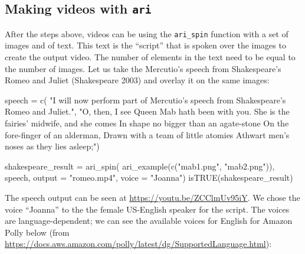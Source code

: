 \hypertarget{making-videos-with-ari-1}{%
\subsection{\texorpdfstring{Making videos with
\texttt{ari}}{Making videos with ari}}\label{making-videos-with-ari-1}}

After the steps above, videos can be using the \texttt{ari\_spin}
function with a set of images and of text. This text is the ``script''
that is spoken over the images to create the output video. The number of
elements in the text need to be equal to the number of images. Let us
take the Mercutio's speech from Shakespeare's Romeo and Juliet
(Shakespeare 2003) and overlay it on the same images:

\begin{Schunk}
\begin{Sinput}
speech =  c(
  "I will now perform part of Mercutio's speech from Shakespeare's Romeo and Juliet.", 
  "O, then, I see Queen Mab hath been with you.
She is the fairies' midwife, and she comes
In shape no bigger than an agate-stone
On the fore-finger of an alderman,
Drawn with a team of little atomies
Athwart men's noses as they lies asleep;")
\end{Sinput}
\end{Schunk}

\begin{Schunk}
\begin{Sinput}
shakespeare_result = ari_spin(
  ari_example(c("mab1.png", "mab2.png")),
  speech, output = "romeo.mp4", voice = "Joanna")
isTRUE(shakespeare_result)
\end{Sinput}
\end{Schunk}

The speech output can be seen at \url{https://youtu.be/ZCClmUv95iY}. We
chose the voice ``Joanna'' to the the female US-English speaker for the
script. The voices are language-dependent; we can see the available
voices for English for Amazon Polly below (from
\url{https://docs.aws.amazon.com/polly/latest/dg/SupportedLanguage.html}):

